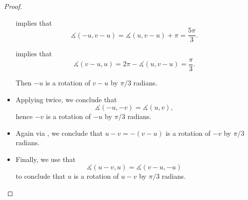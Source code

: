 \begin{proof}
\begin{itemize}
     implies that
    \begin{equation*}
      \measuredangle(-u, v - u) = \measuredangle(u, v - u) + \pi = \frac {5\pi} 3.
    \end{equation*}

     implies that
    \begin{equation*}
      \measuredangle(v - u, u) = 2\pi - \measuredangle(u, v - u) = \frac \pi 3.
    \end{equation*}

    Then \( -u \) is a rotation of \( v - u \) by \( \pi / 3 \) radians.

    \item Applying  twice, we conclude that
    \begin{equation*}
      \measuredangle(-u, -v) = \measuredangle(u, v),
    \end{equation*}
    hence \( -v \) is a rotation of \( -u \) by \( \pi / 3 \) radians.

    \item Again via , we conclude that \( u - v = -(v - u) \) is a rotation of \( -v \) by \( \pi / 3 \) radians.

    \item Finally, we use that
    \begin{equation*}
      \measuredangle(u - v, u) = \measuredangle(v - u, -u)
    \end{equation*}
    to conclude that \( u \) is a rotation of \( u - v \) by \( \pi / 3 \) radians.
  \end{itemize}
\end{proof}

